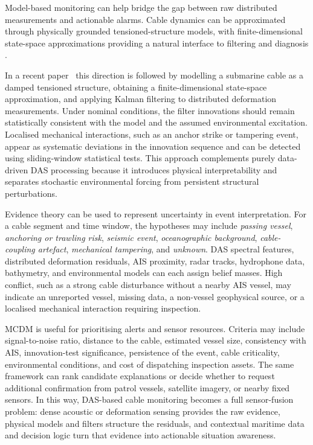 \documentclass{ieeeaccess}
\begin{document}
Model-based monitoring can help bridge the gap between raw distributed measurements and actionable alarms. Cable dynamics can be approximated through physically grounded tensioned-structure models, with finite-dimensional state-space approximations providing a natural interface to filtering and diagnosis \cite{irvine_linear_1974,baudouin_cable_pde_2018}. 

In a recent paper~\cite{fioravanti_cable_med_2026} this direction is followed by modelling a submarine cable as a damped tensioned structure, obtaining a finite-dimensional state-space approximation, and applying Kalman filtering to distributed deformation measurements. Under nominal conditions, the filter innovations should remain statistically consistent with the model and the assumed environmental excitation. Localised mechanical interactions, such as an anchor strike or tampering event, appear as systematic deviations in the innovation sequence and can be detected using sliding-window statistical tests. This approach complements purely data-driven DAS processing because it introduces physical interpretability and separates stochastic environmental forcing from persistent structural perturbations.

Evidence theory can be used to represent uncertainty in event interpretation. For a cable segment and time window, the hypotheses may include \emph{passing vessel}, \emph{anchoring or trawling risk}, \emph{seismic event}, \emph{oceanographic background}, \emph{cable-coupling artefact}, \emph{mechanical tampering}, and \emph{unknown}. DAS spectral features, distributed deformation residuals, AIS proximity, radar tracks, hydrophone data, bathymetry, and environmental models can each assign belief masses. High conflict, such as a strong cable disturbance without a nearby AIS vessel, may indicate an unreported vessel, missing data, a non-vessel geophysical source, or a localised mechanical interaction requiring inspection.

MCDM is useful for prioritising alerts and sensor resources. Criteria may include signal-to-noise ratio, distance to the cable, estimated vessel size, consistency with AIS, innovation-test significance, persistence of the event, cable criticality, environmental conditions, and cost of dispatching inspection assets. The same framework can rank candidate explanations or decide whether to request additional confirmation from patrol vessels, satellite imagery, or nearby fixed sensors. In this way, DAS-based cable monitoring becomes a full sensor-fusion problem: dense acoustic or deformation sensing provides the raw evidence, physical models and filters structure the residuals, and contextual maritime data and decision logic turn that evidence into actionable situation awareness.
\end{document}
